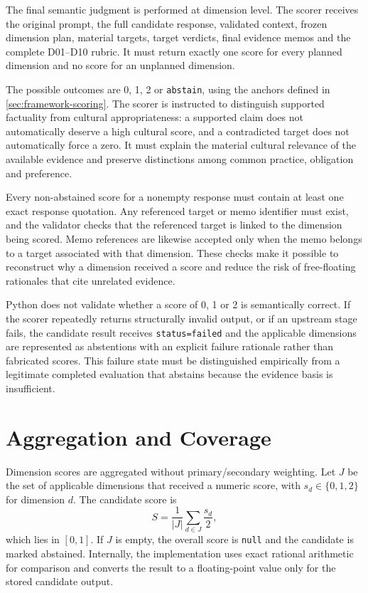 The final semantic judgment is performed at dimension level. The scorer receives the original prompt, the full candidate response, validated context, frozen dimension plan, material targets, target verdicts, final evidence memos and the complete D01--D10 rubric. It must return exactly one score for every planned dimension and no score for an unplanned dimension.

The possible outcomes are 0, 1, 2 or \texttt{abstain}, using the anchors defined in \cref{sec:framework-scoring}. The scorer is instructed to distinguish supported factuality from cultural appropriateness: a supported claim does not automatically deserve a high cultural score, and a contradicted target does not automatically force a zero. It must explain the material cultural relevance of the available evidence and preserve distinctions among common practice, obligation and preference.

Every non-abstained score for a nonempty response must contain at least one exact response quotation. Any referenced target or memo identifier must exist, and the validator checks that the referenced target is linked to the dimension being scored. Memo references are likewise accepted only when the memo belongs to a target associated with that dimension. These checks make it possible to reconstruct why a dimension received a score and reduce the risk of free-floating rationales that cite unrelated evidence.

Python does not validate whether a score of 0, 1 or 2 is semantically correct. If the scorer repeatedly returns structurally invalid output, or if an upstream stage fails, the candidate result receives \texttt{status=failed} and the applicable dimensions are represented as abstentions with an explicit failure rationale rather than fabricated scores. This failure state must be distinguished empirically from a legitimate completed evaluation that abstains because the evidence basis is insufficient.

\section{Aggregation and Coverage}
\label{sec:aggregation}

Dimension scores are aggregated without primary/secondary weighting. Let $J$ be the set of applicable dimensions that received a numeric score, with $s_d \in \{0,1,2\}$ for dimension $d$. The candidate score is
\begin{equation}
S = \frac{1}{|J|}\sum_{d \in J}\frac{s_d}{2},
\label{eq:verifier-score}
\end{equation}
which lies in $[0,1]$. If $J$ is empty, the overall score is \texttt{null} and the candidate is marked abstained. Internally, the implementation uses exact rational arithmetic for comparison and converts the result to a floating-point value only for the stored candidate output.

